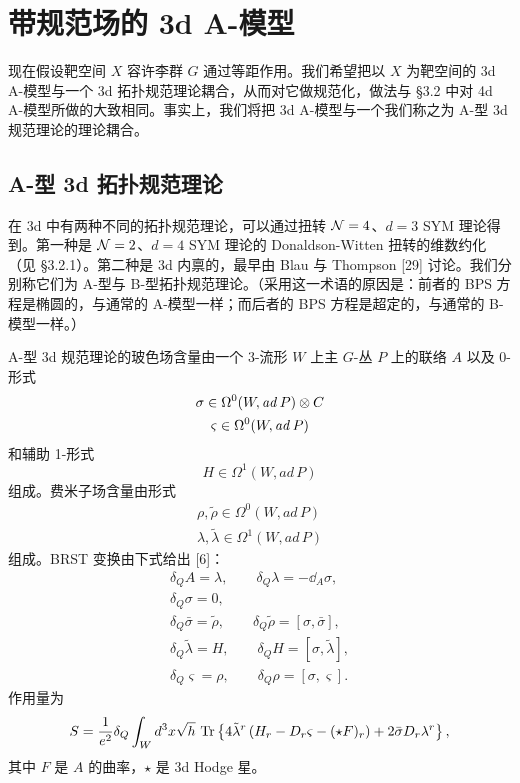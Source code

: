 
\section{带规范场的 3d A-模型}

现在假设靶空间 $X$ 容许李群 $G$ 通过等距作用。我们希望把以 $X$ 为靶空间的 3d A-模型与一个 3d 拓扑规范理论耦合，从而对它做规范化，做法与 §3.2 中对 4d A-模型所做的大致相同。事实上，我们将把 3d A-模型与一个我们称之为 A-型 3d 规范理论的理论耦合。

\subsection{A-型 3d 拓扑规范理论}

在 3d 中有两种不同的拓扑规范理论，可以通过扭转 $\mathcal{N}=4$、$d=3$ SYM 理论得到。第一种是 $\mathcal{N}=2$、$d=4$ SYM 理论的 Donaldson-Witten 扭转的维数约化（见 §3.2.1）。第二种是 3d 内禀的，最早由 Blau 与 Thompson [29] 讨论。我们分别称它们为 A-型与 B-型拓扑规范理论。（采用这一术语的原因是：前者的 BPS 方程是椭圆的，与通常的 A-模型一样；而后者的 BPS 方程是超定的，与通常的 B-模型一样。）

A-型 3d 规范理论的玻色场含量由一个 3-流形 $W$ 上主 $G$-丛 $P$ 上的联络 $A$ 以及 0-形式
\begin{gather*}
  \sigma\in\Omega^0(W,\mathit{ad}\,P)\otimes C\\
  \varsigma\in\Omega^0(W,\mathit{ad}\,P)
\end{gather*}
和辅助 1-形式
\[
  H\in\Omega^1(W,\mathit{ad}\,P)
\]
组成。费米子场含量由形式
\begin{gather*}
  \rho,\tilde\rho\in\Omega^0(W,\mathit{ad}\,P)\\
  \lambda,\tilde\lambda\in\Omega^1(W,\mathit{ad}\,P)
\end{gather*}
组成。BRST 变换由下式给出 [6]：
\begin{gather*}
  \delta_QA=\lambda,\qquad \delta_Q\lambda=-\dd_A\sigma,\\
  \delta_Q\sigma=0,\\
  \delta_Q\bar\sigma=\tilde\rho,\qquad \delta_Q\tilde\rho=[\sigma,\bar\sigma],\\
  \delta_Q\tilde\lambda=H,\qquad \delta_QH=[\sigma,\tilde\lambda],\\
  \delta_Q\varsigma=\rho,\qquad \delta_Q\rho=[\sigma,\varsigma].
\end{gather*}
作用量为
\[
  S=\frac{1}{e^2}\delta_Q\int_Wd^3x\sqrt{h}\,\operatorname{Tr}\left\{4\tilde\lambda^r\left(H_r-D_r\varsigma-(\star F)_r\right)+2\bar\sigma D_r\lambda^r\right\},
\]
其中 $F$ 是 $A$ 的曲率，$\star$ 是 3d Hodge 星。

